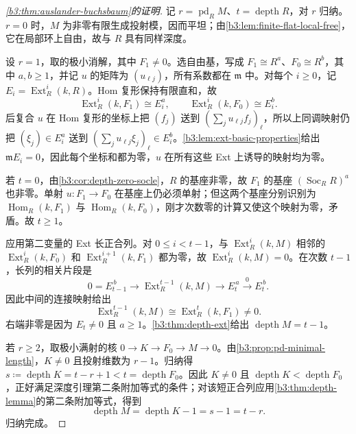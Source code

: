 \begin{proof}[\cref{b3:thm:auslander-buchsbaum}的证明]
	记 \(r=\operatorname{pd}_RM\)、\(t=\operatorname{depth}R\)，对 \(r\) 归纳。\(r=0\) 时，\(M\) 为非零有限生成投射模，因而平坦；由\cref{b3:lem:finite-flat-local-free}，它在局部环上自由，故与 \(R\) 具有同样深度。

	设 \(r=1\)，取的极小消解，其中 \(F_1\ne0\)。选自由基，写成 \(F_1\cong R^a\)、\(F_0\cong R^b\)，其中 \(a,b\ge1\)，并记 \(u\) 的矩阵为 \((u_{\ell j})\)，所有系数都在 \(\mathfrak m\) 中。对每个 \(i\ge0\)，记 \(E_i=\operatorname{Ext}_R^i(k,R)\)。Hom 复形保持有限直和，故
	\[
		\operatorname{Ext}_R^i(k,F_1)\cong E_i^a, \qquad\operatorname{Ext}_R^i(k,F_0)\cong E_i^b.
	\]
	后复合 \(u\) 在 Hom 复形的坐标上把 \((f_j)\) 送到 \((\sum_j u_{\ell j}f_j)_\ell\)，所以上同调映射仍把 \((\xi_j)\in E_i^a\) 送到 \((\sum_j u_{\ell j}\xi_j)_\ell\in E_i^b\)。\cref{b3:lem:ext-basic-properties}给出 \(\mathfrak mE_i=0\)，因此每个坐标和都为零，\(u\) 在所有这些 Ext 上诱导的映射均为零。

	若 \(t=0\)，由\cref{b3:cor:depth-zero-socle}，\(R\) 的基座非零，故 \(F_1\) 的基座 \((\operatorname{Soc}_RR)^a\) 也非零。单射 \(u:F_1\to F_0\) 在基座上仍必须单射；但这两个基座分别识别为 \(\operatorname{Hom}_R(k,F_1)\) 与 \(\operatorname{Hom}_R(k,F_0)\)，刚才次数零的计算又使这个映射为零，矛盾。故 \(t\ge1\)。

	应用第二变量的 Ext 长正合列。对 \(0\le i<t-1\)，与 \(\operatorname{Ext}_R^i(k,M)\) 相邻的 \(\operatorname{Ext}_R^i(k,F_0)\) 和 \(\operatorname{Ext}_R^{i+1}(k,F_1)\) 都为零，故 \(\operatorname{Ext}_R^i(k,M)=0\)。在次数 \(t-1\)，长列的相关片段是
	\[
		0=E_{t-1}^{\,b}\longrightarrow\operatorname{Ext}_R^{t-1}(k,M) \longrightarrow E_t^{\,a}\xrightarrow{0}E_t^{\,b}.
	\]
	因此中间的连接映射给出
	\[
		\operatorname{Ext}_R^{t-1}(k,M) \cong\operatorname{Ext}_R^t(k,F_1)\ne0.
	\]
	右端非零是因为 \(E_t\ne0\) 且 \(a\ge1\)。\cref{b3:thm:depth-ext}给出 \(\operatorname{depth}M=t-1\)。

	若 \(r\ge2\)，取极小满射的核 \(0\to K\to F_0\to M\to0\)。由\cref{b3:prop:pd-minimal-length}，\(K\ne0\) 且投射维数为 \(r-1\)。归纳得 \(s\coloneqq\operatorname{depth}K=t-r+1<t=\operatorname{depth}F_0\)。因此 \(K\ne0\) 且 \(\operatorname{depth}K<\operatorname{depth}F_0\)，正好满足深度引理第二条附加等式的条件；对该短正合列应用\cref{b3:thm:depth-lemma}的第二条附加等式，得到
	\[
		\operatorname{depth}M=\operatorname{depth}K-1=s-1=t-r.
	\]
	归纳完成。
\end{proof}

